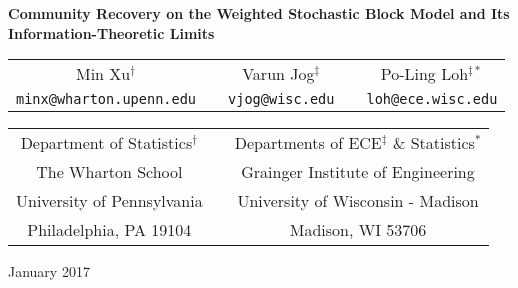 \documentclass{article}
\begin{document}
\begin{center}
{\bf{\Large{Community Recovery on the Weighted Stochastic Block Model and Its Information-Theoretic Limits}}}

\vspace*{.25in}

\begin{tabular}{ccccc}
{\large{Min Xu$^\dagger$}} & \hspace*{.2in} & {\large{Varun Jog$^\ddagger$}} & \hspace*{.2in} & {\large{Po-Ling Loh$^{\ddagger*}$}} \\
{\large{\texttt{minx@wharton.upenn.edu}}} & & {\large{\texttt{vjog@wisc.edu}}} & & {\large{\texttt{loh@ece.wisc.edu}}}
\end{tabular}

\vspace{.2in}

\begin{tabular}{ccc}
Department of Statistics$^\dagger$ & \hspace{.3in} & Departments of ECE$^\ddagger$ \& Statistics$^*$ \\
The Wharton School && Grainger Institute of Engineering \\
University of Pennsylvania && University of Wisconsin - Madison \\ Philadelphia, PA 19104 & & Madison, WI 53706
\end{tabular}
 
\vspace*{.2in}

January 2017

\vspace*{.2in}

\end{center}
\end{document}
